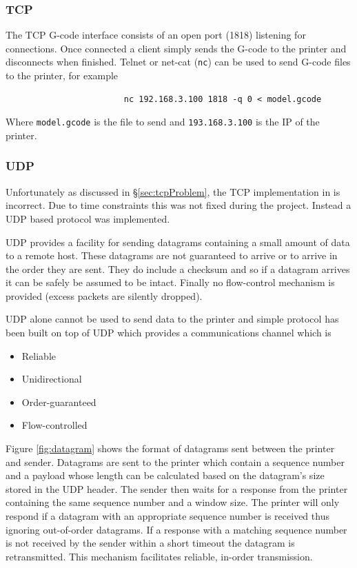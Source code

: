 				\subsubsection{TCP}
					
					The TCP G-code interface consists of an open port (1818) listening for
					connections. Once connected a client simply sends the G-code to the
					printer and disconnects when finished. Telnet or net-cat (\verb|nc|)
					can be used to send G-code files to the printer, for example
					\begin{verbatim}
						nc 192.168.3.100 1818 -q 0 < model.gcode
					\end{verbatim}
					Where \verb|model.gcode| is the file to send and \verb|193.168.3.100|
					is the IP of the printer.
				
				\subsubsection{UDP}
					
					\label{sec:udpimpl}
					
					Unfortunately as discussed in \S\ref{sec:tcpProblem}, the TCP
					implementation in \uIP{} is incorrect. Due to time constraints this
					was not fixed during the project. Instead a UDP based protocol was
					implemented.
					
					UDP provides a facility for sending datagrams containing a small
					amount of data to a remote host. These datagrams are not guaranteed to
					arrive or to arrive in the order they are sent. They do include a
					checksum and so if a datagram arrives it can be safely be assumed to
					be intact. Finally no flow-control mechanism is provided (excess
					packets are silently dropped).
					
					UDP alone cannot be used to send data to the printer and simple
					protocol has been built on top of UDP which provides a communications
					channel which is
					\begin{itemize}
						\item Reliable
						\item Unidirectional
						\item Order-guaranteed
						\item Flow-controlled
					\end{itemize}
					
					Figure \ref{fig:datagram} shows the format of datagrams sent between
					the printer and sender. Datagrams are sent to the printer which
					contain a sequence number and a payload whose length can be calculated
					based on the datagram's size stored in the UDP header. The sender then
					waits for a response from the printer containing the same sequence
					number and a window size. The printer will only respond if a datagram
					with an appropriate sequence number is received thus ignoring
					out-of-order datagrams. If a response with a matching sequence number
					is not received by the sender within a short timeout the datagram is
					retransmitted. This mechanism facilitates reliable, in-order
					transmission.
					
